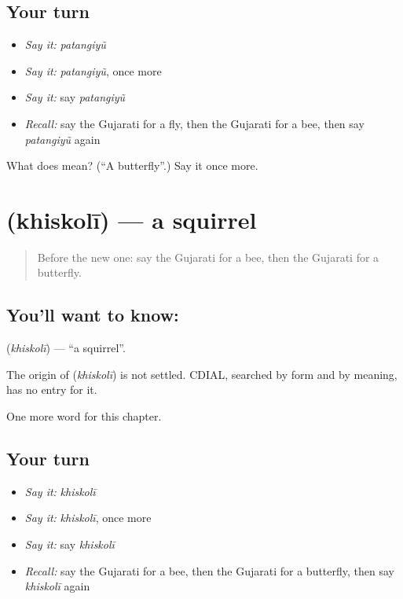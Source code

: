 \subsection*{Your turn}
\begin{itemize}
\raggedright
  \item \emph{Say it:} \emph{patangiyũ}
  \item \emph{Say it:} \emph{patangiyũ}, once more
  \item \emph{Say it:} say \emph{patangiyũ}
  \item \emph{Recall:} say the Gujarati for a fly, then the Gujarati for a bee, then say \emph{patangiyũ} again
\end{itemize}

\begin{tcolorbox}[breakable,colback=teal!4,colframe=teal!35!black,title={Before you move on}]
What does  mean? (\textquotedblleft{}A butterfly\textquotedblright{}.) Say it once more.
\end{tcolorbox}
\section[\texorpdfstring{\gu{ખિસકોલી} (khiskolī)}{ખિસકોલી (khiskolī)}]{ (khiskolī) — a squirrel}

\label{lesson:GU-C124-khiskoli}



\begin{quote}
Before the new one: say the Gujarati for a bee, then the Gujarati for a butterfly.
\end{quote}

\subsection*{You'll want to know: }
\textbf{} (\emph{khiskolī}) — \textquotedblleft{}a squirrel\textquotedblright{}.

\begin{cousinweb}
The origin of \textbf{} (\emph{khiskolī}) is not settled. CDIAL, searched by form and by meaning, has no entry for it.
\end{cousinweb}

\begin{grammarlens}[title={What you've built}]
One more word for this chapter.
\end{grammarlens}

\subsection*{Your turn}
\begin{itemize}
\raggedright
  \item \emph{Say it:} \emph{khiskolī}
  \item \emph{Say it:} \emph{khiskolī}, once more
  \item \emph{Say it:} say \emph{khiskolī}
  \item \emph{Recall:} say the Gujarati for a bee, then the Gujarati for a butterfly, then say \emph{khiskolī} again
\end{itemize}

